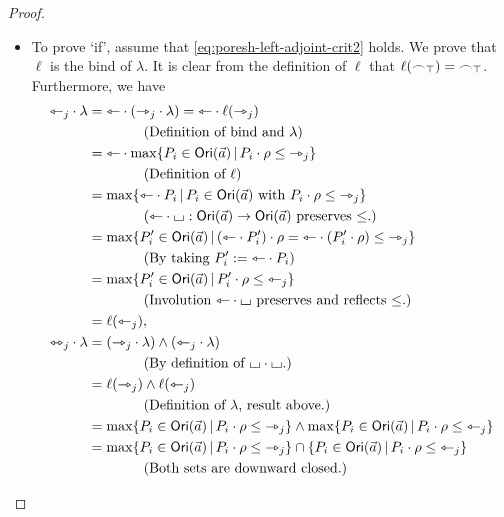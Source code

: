 \documentclass[a4paper]{memoir}
\begin{document}
\begin{proof}
\begin{enumerate}
\begin{itemize}
			\item To prove `if', assume that \cref{eq:poresh-left-adjoint-crit2} holds. We prove that $\ell$ is the bind of $\lambda$.
			It is clear from the definition of $\ell$ that $\ell({\frown}_\top) = {\frown}_\top$.
			Furthermore, we have
			\begin{align*}
				\tejsym_j \cdot \lambda
				&= \tejsym \cdot (\jetsym_j \cdot \lambda)
				= \tejsym \cdot \ell(\jetsym_j) \\
				& \qquad \qquad \text{(Definition of bind and $\lambda$)} \\
				&= \tejsym \cdot \max \set{P_i \in \orisymbol(\vec a)}{P_i \cdot \rho \leq \jetsym_j} \\
				& \qquad \qquad \text{(Definition of $\ell$)} \\
				&= \max \set{\tejsym \cdot P_i}{P_i \in \orisymbol(\vec a) \text{ with } P_i \cdot \rho \leq \jetsym_j} \\
				& \qquad \qquad \text{($\tejsym \cdot \loch : \orisymbol(\vec a) \to \orisymbol(\vec a)$ preserves $\leq$.)} \\
				&= \max \set{P'_i \in \orisymbol(\vec a)}{(\tejsym \cdot P'_i) \cdot \rho = \tejsym \cdot (P'_i \cdot \rho) \leq \jetsym_j} \\
				& \qquad \qquad \text{(By taking $P'_i := \tejsym \cdot P_i$)} \\
				&= \max \set{P'_i \in \orisymbol(\vec a)}{P'_i \cdot \rho \leq \tejsym_j} \\
				& \qquad \qquad \text{(Involution $\tejsym \cdot \loch$ preserves and reflects $\leq$.)} \\
				&= \ell(\tejsym_j), \\
				\equijetsym_j \cdot \lambda
				&= (\jetsym_j \cdot \lambda) \wedge (\tejsym_j \cdot \lambda) \\
				& \qquad \qquad \text{(By definition of $\loch \cdot \loch$.)} \\
				&= \ell(\jetsym_j) \wedge \ell(\tejsym_j) \\
				& \qquad \qquad \text{(Definition of $\lambda$, result above.)} \\
				&= \max \set{P_i \in \orisymbol(\vec a)}{P_i \cdot \rho \leq \jetsym_j} \wedge \max \set{P_i \in \orisymbol(\vec a)}{P_i \cdot \rho \leq \tejsym_j} \\
				&= \max \set{P_i \in \orisymbol(\vec a)}{P_i \cdot \rho \leq \jetsym_j} \cap \set{P_i \in \orisymbol(\vec a)}{P_i \cdot \rho \leq \tejsym_j} \\
				& \qquad \qquad \text{(Both sets are downward closed.)} \\

\end{align*}
\end{itemize}
\end{enumerate}
\end{proof}
\end{document}
